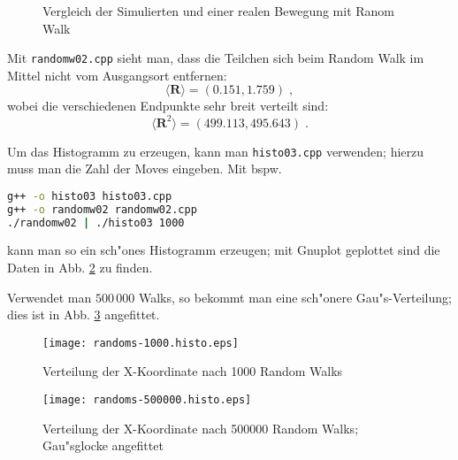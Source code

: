 \documentclass[a4paper,12pt]{article}
\renewcommand{\vec}[1]{\ensuremath{\boldsymbol{#1}}}
\newcommand{\abs}[0]{\bigskip\noindent}
\begin{document}
\begin{figure}
  \centering
    \subfigure{\texttt{[image: rw-10000-2]}}
  \caption{Vergleich der Simulierten und einer realen Bewegung mit Ranom Walk}
  \label{fig:vgl-real-rw}
\end{figure}

\abs
Mit \texttt{randomw02.cpp} sieht man, dass die Teilchen sich beim
Random Walk im Mittel nicht vom Ausgangsort entfernen:
\begin{equation}
  \label{eq:1}
  \langle \vec R  \rangle = ( 0.151 , 1.759 ) \;,
\end{equation}
wobei die verschiedenen Endpunkte sehr breit verteilt sind:
\begin{equation}
  \label{eq:2}
  \langle \vec R^2  \rangle = ( 499.113 , 495.643 ) \;.
\end{equation}

\abs
Um das Histogramm zu erzeugen, kann man \texttt{histo03.cpp}
verwenden; hierzu muss man die Zahl der Moves eingeben. Mit bspw.
\begin{lstlisting}[language=bash]
g++ -o histo03 histo03.cpp
g++ -o randomw02 randomw02.cpp
./randomw02 | ./histo03 1000
\end{lstlisting}
kann man so ein sch"ones Histogramm erzeugen; mit Gnuplot geplottet
sind die Daten in Abb. \ref{fig:distrrandomw1000} zu finden.

Verwendet man $500\,000$ Walks, so bekommt man eine sch"onere
Gau"s-Verteilung; dies ist in Abb. \ref{fig:distrrandomw500000}
angefittet.



\begin{figure}
  \centering
  \texttt{[image: randoms-1000.histo.eps]}
  \caption{Verteilung der X-Koordinate nach 1000 Random Walks}
  \label{fig:distrrandomw1000}
\end{figure}

\begin{figure}
  \centering
  \texttt{[image: randoms-500000.histo.eps]}
  \caption{Verteilung der X-Koordinate nach 500000 Random Walks;
    Gau"sglocke angefittet}
  \label{fig:distrrandomw500000}
\end{figure}
\end{document}
